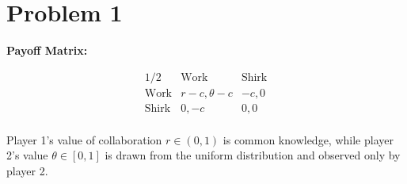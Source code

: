 \documentclass[11pt]{article}
\begin{document}
	
	
	\psetheader
\section*{Problem 1}

\textbf{Payoff Matrix:}

\[
\begin{array}{c|c|c}
1/2 & \text{Work} & \text{Shirk} \\
\hline
\text{Work} & r - c, \theta - c & -c, 0 \\
\text{Shirk} & 0, -c & 0, 0 \\
\end{array}
\]

Player 1's value of collaboration \( r \in (0,1) \) is common knowledge, while player 2's value \( \theta \in [0,1] \) is drawn from the uniform distribution and observed only by player 2.
\end{document}
